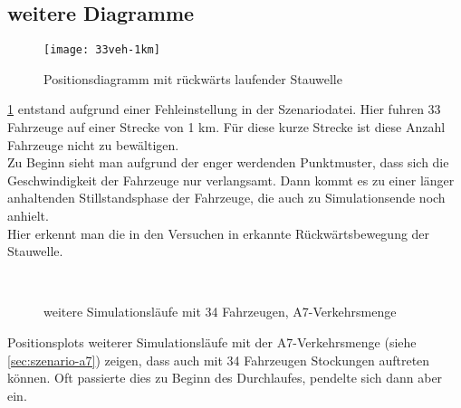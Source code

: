 \newpage

\subsection{weitere Diagramme}


\begin{figure}[hptb]
 \centering
 \texttt{[image: 33veh-1km]}
 \caption{Positionsdiagramm mit rückwärts laufender Stauwelle}
 \label{figure:33veh-1km}
\end{figure}

\cref{figure:33veh-1km} entstand aufgrund einer Fehleinstellung in der Szenariodatei.
Hier fuhren 33 Fahrzeuge auf einer Strecke von 1 km.
Für diese kurze Strecke ist diese Anzahl Fahrzeuge nicht zu bewältigen.
\\
Zu Beginn sieht man aufgrund der enger werdenden Punktmuster, dass sich die Geschwindigkeit der Fahrzeuge nur verlangsamt. Dann kommt es zu einer länger anhaltenden Stillstandsphase der Fahrzeuge, die auch zu Simulationsende noch anhielt.
\\
Hier erkennt man die in den Versuchen in \cite{na-sch} erkannte Rückwärtsbewegung der Stauwelle.


\newpage


\begin{figure}[hptb]
  \centering
   \qquad 
    \\
  \caption{weitere Simulationsläufe mit 34 Fahrzeugen, A7-Verkehrsmenge}
  \label{figure:a7-34veh-more}
\end{figure}

Positionsplots weiterer Simulationsläufe mit der A7-Verkehrsmenge (siehe \cref{sec:szenario-a7}) zeigen, dass auch mit 34 Fahrzeugen Stockungen auftreten können.
Oft passierte dies zu Beginn des Durchlaufes, pendelte sich dann aber ein.


\newpage


